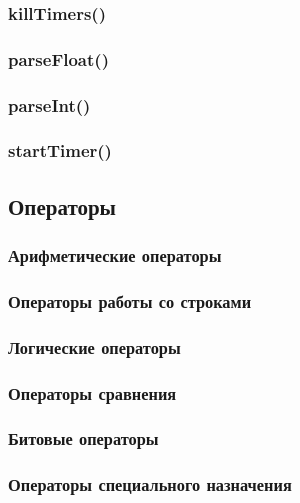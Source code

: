 \documentclass[11pt,russian,a4paper]{article}
\begin{document}
\subsubsection{killTimers()}


\subsubsection{parseFloat()}


\subsubsection{parseInt()}


\subsubsection{startTimer()}


\subsection{Операторы}


\subsubsection{Арифметические операторы}


\subsubsection{Операторы работы со строками}


\subsubsection{Логические операторы}


\subsubsection{Операторы сравнения}


\subsubsection{Битовые операторы}


\subsubsection{Операторы специального назначения}
\end{document}
